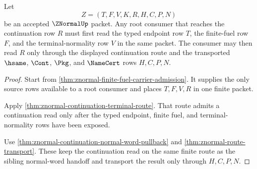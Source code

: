 \begin{theorem}
\label{thm:znormal-terminal-normality-consumer-gate}
Let
$$
Z=(T,F,V,K,R,H,C,P,N)
$$
be an accepted $\ZNormalUp$ packet. Any root consumer that reaches the continuation row $R$ must first read the typed endpoint row $T$, the finite-fuel row $F$, and the terminal-normality row $V$ in the same packet. The consumer may then read $R$ only through the displayed continuation route and the transported $\hsame$, $\Cont$, $\Pkg$, and $\NameCert$ rows $H,C,P,N$.
\end{theorem}
\begin{proof}
Start from \autoref{thm:znormal-finite-fuel-carrier-admission}. It supplies the only source rows available to a root consumer and places $T,F,V,R$ in one finite packet.

Apply \autoref{thm:znormal-continuation-terminal-route}. That route admits a continuation read only after the typed endpoint, finite fuel, and terminal-normality rows have been exposed.

Use \autoref{thm:znormal-continuation-normal-word-pullback} and \autoref{thm:znormal-route-transport}. These keep the continuation read on the same finite route as the sibling normal-word handoff and transport the result only through $H,C,P,N$.
\end{proof}


